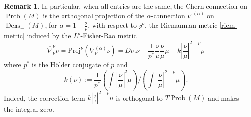 \documentclass[11pt]{amsart}
\theoremstyle{definition}
\newtheorem{remark}[theorem]{Remark}
\newcommand{\Abs}[1]{\left|#1\right|}
\newcommand{\Prob}{\operatorname{Prob}(M)}
\newcommand{\Dens}{\operatorname{Dens}_+(M)}
\newcommand{\nablabar}{\overline{\nabla}}
\begin{document}
\begin{remark}\label{rem:chern-prob}
In particular, when all entries are the same, the Chern connection on $\Prob$ is the orthogonal projection of the $\alpha$-connection $\nabla^{(\alpha)}$ on $\Dens$, for $\alpha=1-\frac{2}{p}$, with respect to $g^\nu$, the Riemannian metric \eqref{riem-metric} induced by the $L^p$-Fisher-Rao metric
    \begin{equation}\label{chern-prob-2}
    \nablabar^\nu_\nu\nu= \mathrm{Proj}^{\nu}\left(\nabla^{(\alpha)}_\nu\nu\right) = D\nu.\nu -\frac{1}{p^*}\frac{\nu}{\mu}\frac{\nu}{\mu}\mu + k\Abs{\frac{\nu}{\mu}}^{2-p}\mu
    \end{equation}
    where $p^*$ is the Hölder conjugate of $p$ and 
    $$k(\nu):=\frac{1}{p^*}\left(\int\Abs{\frac{\nu}{\mu}}^2\mu\right) / \left(\int\Abs{\frac{\nu}{\mu}}^{2-p}\mu\right).$$
    Indeed, the correction term $k\Abs{\frac{\nu}{\mu}}^{2-p}\mu$ is orthogonal to $T\Prob$ and makes the integral zero.
\end{remark}
\end{document}

